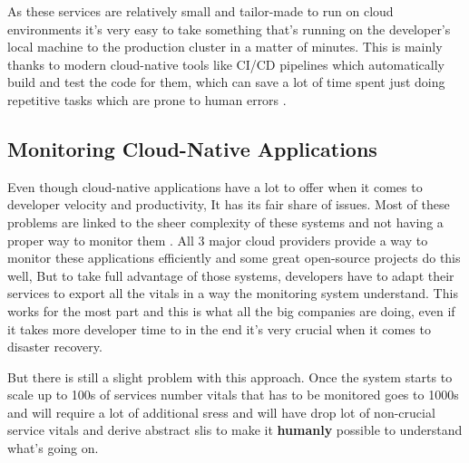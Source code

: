 As these services are relatively small and tailor-made to run on cloud environments it's very easy to take something that's running on the developer's local machine to the production cluster in a matter of minutes. This is mainly thanks to modern cloud-native tools like CI/CD pipelines which automatically build and test the code for them, which can save a lot of time spent just doing repetitive tasks which are prone to human errors \citep{Whataret68:online}.

\subsection{Monitoring Cloud-Native Applications} \label{monitoring-bg}
Even though cloud-native applications have a lot to offer when it comes to developer velocity and productivity, It has its fair share of issues. Most of these problems are linked to the sheer complexity of these systems and not having a proper way to monitor them \citep{5WaysYou35:online}. All 3 major cloud providers provide a way to monitor these applications efficiently and some great open-source projects do this well, But to take full advantage of those systems, developers have to adapt their services to export all the vitals in a way the monitoring system understand. This works for the most part and this is what all the big companies are doing, even if it takes more developer time to in the end it's very crucial when it comes to disaster recovery.

But there is still a slight problem with this approach. Once the system starts to scale up to 100s of services number vitals that has to be monitored goes to 1000s and will require a lot of additional \acp{sres} and will have drop lot of non-crucial service vitals and derive abstract \acp{sli} to make it \textbf{humanly} possible to understand what's going on.\\
